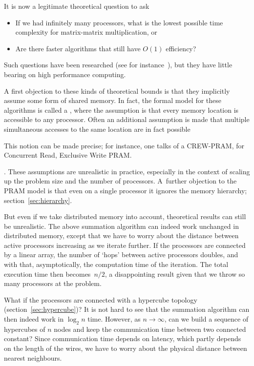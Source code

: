 It is now a legitimate theoretical question to ask
\begin{itemize}
\item If we had infinitely many processors, what is the lowest
  possible time complexity for matrix-matrix multiplication, or
\item Are there faster algorithms that still have $O(1)$ efficiency?
\end{itemize}
Such questions have been researched (see for
instance~\cite{He:surveyparallel}), but they have little bearing on
high performance computing. 

A first objection to these kinds of theoretical bounds is that they
implicitly assume some form of shared memory. In fact, the formal
model for these algorithms is called a , where the
assumption is that every memory location is accessible to any
processor.  Often an additional assumption is made that multiple simultaneous
accesses to the same location are in fact possible
\begin{footnoteenv}
  {This notion
  can be made precise; for instance, one talks of a CREW-PRAM, for
  Concurrent Read, Exclusive Write PRAM.}
\end{footnoteenv}
. These assumptions are
unrealistic in practice, especially in the context of scaling up the
problem size and the number of processors. A~further objection to the
\ac{PRAM} model is that even on a single processor it ignores the
memory hierarchy; section~\ref{sec:hierarchy}.

But even if we take distributed memory into account, theoretical
results can still be unrealistic. The above summation algorithm can
indeed work unchanged in distributed memory, except that we have to
worry about the distance between active processors increasing as we
iterate further. If the processors are connected by a linear array,
the number of `hops' between active processors doubles, and with that,
asymptotically, the computation time of the iteration. The total
execution time then becomes~$n/2$, a disappointing result given that
we throw so many processors at the problem. 

What if the processors are
connected with a hypercube topology (section~\ref{sec:hypercube})?
It is not hard to see that the
summation algorithm can then indeed work in $\log_2n$ time. However,
as $n\rightarrow\infty$, can we build a sequence of hypercubes of $n$ nodes
and keep the communication time between two connected constant? Since
communication time depends on latency, which partly depends on the
length of the wires, we have to worry about the physical distance
between nearest neighbours.

